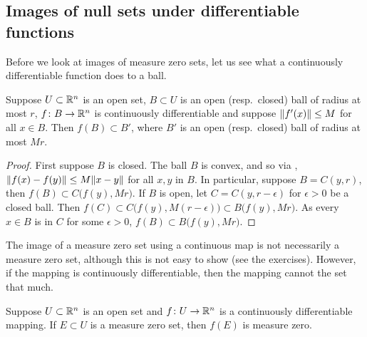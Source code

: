 \subsection{Images of null sets under differentiable functions}

Before we look at images of measure zero sets, let us see what a
continuously differentiable function does to a ball.

\begin{lemma} \label{lemma:ballmapder}
Suppose $U \subset {\mathbb{R}}^n$ is an open set,
$B \subset U$ is an open (resp.\ closed) ball of radius at most $r$, $f \colon B \to {\mathbb{R}}^n$ is continuously
differentiable and suppose $\lVert {f'(x)} \rVert \leq M$ for all $x \in B$.
Then $f(B) \subset B'$, where $B'$ is an open (resp.\ closed) ball of radius at most $Mr$.
\end{lemma}

\begin{proof}
First suppose $B$ is closed.
The ball $B$ is convex, and so via
,
$\lVert {f(x)-f(y)} \rVert \leq M \lVert {x-y} \rVert$
for all $x,y$ in $B$.  In particular, suppose $B = C(y,r)$,
then $f(B) \subset C\bigl(f(y),M r \bigr)$.
If $B$ is open, let $C = C(y,r-\epsilon)$ for $\epsilon > 0$
be a closed ball.
Then $f(C) \subset C\bigl(f(y),M(r-\epsilon)\bigr) \subset B\bigl(f(y),Mr\bigr)$.
As every $x \in B$ is in $C$ for some $\epsilon > 0$,
$f(B) \subset  B\bigl(f(y),Mr\bigr)$.
\end{proof}

The image of a measure zero set using a continuous map is not necessarily
a measure zero set, although this is not easy to show (see the exercises).
However, if the mapping is continuously
differentiable, then the mapping cannot  the set that much.

\begin{prop} \label{prop:imagenull}
Suppose $U \subset {\mathbb{R}}^n$ is an open set and $f \colon U \to {\mathbb{R}}^n$
is a continuously differentiable mapping.  If $E \subset U$ is a 
measure zero set, then $f(E)$ is measure zero.
\end{prop}

